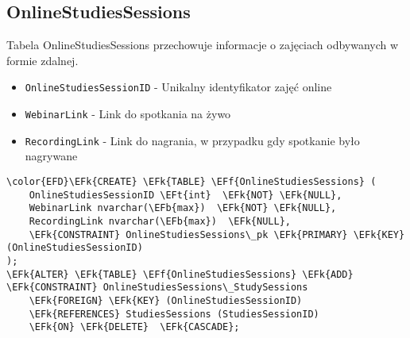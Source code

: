 \documentclass[11pt]{article}
\newcommand{\EFk}[1]{\textcolor{EFk}{\textbf{#1}}} %
\newcommand{\EFb}[1]{\textcolor{EFb}{\textbf{#1}}} %
\newcommand{\EFf}[1]{\textcolor{EFf}{#1}} %
\newcommand{\EFt}[1]{\textcolor{EFt}{\textbf{#1}}} %
\begin{document}
\subsection{OnlineStudiesSessions}
\label{sec:org97acb30}
Tabela OnlineStudiesSessions przechowuje informacje o zajęciach odbywanych w formie zdalnej.
\begin{itemize}
\item \texttt{OnlineStudiesSessionID} - Unikalny identyfikator zajęć online
\item \texttt{WebinarLink} - Link do spotkania na żywo
\item \texttt{RecordingLink} - Link do nagrania, w przypadku gdy spotkanie było nagrywane
\end{itemize}
\begin{Code}
\begin{Verbatim}
\color{EFD}\EFk{CREATE} \EFk{TABLE} \EFf{OnlineStudiesSessions} (
    OnlineStudiesSessionID \EFt{int}  \EFk{NOT} \EFk{NULL},
    WebinarLink nvarchar(\EFb{max})  \EFk{NOT} \EFk{NULL},
    RecordingLink nvarchar(\EFb{max})  \EFk{NULL},
    \EFk{CONSTRAINT} OnlineStudiesSessions\_pk \EFk{PRIMARY} \EFk{KEY}  (OnlineStudiesSessionID)
);
\EFk{ALTER} \EFk{TABLE} \EFf{OnlineStudiesSessions} \EFk{ADD} \EFk{CONSTRAINT} OnlineStudiesSessions\_StudySessions
    \EFk{FOREIGN} \EFk{KEY} (OnlineStudiesSessionID)
    \EFk{REFERENCES} StudiesSessions (StudiesSessionID)
    \EFk{ON} \EFk{DELETE}  \EFk{CASCADE};
\end{Verbatim}
\end{Code}
\end{document}
